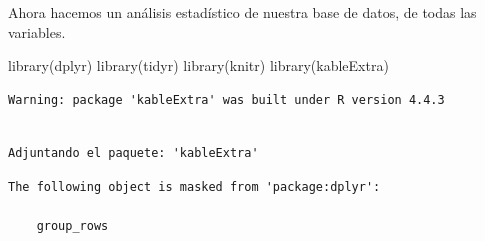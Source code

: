 \documentclass[
  letterpaper,
  DIV=11,
  numbers=noendperiod]{scrartcl}
\newenvironment{Shaded}{\begin{snugshade}}{\end{snugshade}}
\newcommand{\FunctionTok}[1]{\textcolor[rgb]{0.28,0.35,0.67}{#1}}
\newcommand{\NormalTok}[1]{\textcolor[rgb]{0.00,0.23,0.31}{#1}}
\begin{document}
Ahora hacemos un análisis estadístico de nuestra base de datos, de todas
las variables.

\begin{Shaded}
\begin{Highlighting}[]
\FunctionTok{library}\NormalTok{(dplyr)}
\FunctionTok{library}\NormalTok{(tidyr)}
\FunctionTok{library}\NormalTok{(knitr)}
\FunctionTok{library}\NormalTok{(kableExtra)}
\end{Highlighting}
\end{Shaded}

\begin{verbatim}
Warning: package 'kableExtra' was built under R version 4.4.3
\end{verbatim}

\begin{verbatim}

Adjuntando el paquete: 'kableExtra'
\end{verbatim}

\begin{verbatim}
The following object is masked from 'package:dplyr':

    group_rows
\end{verbatim}
\end{document}
